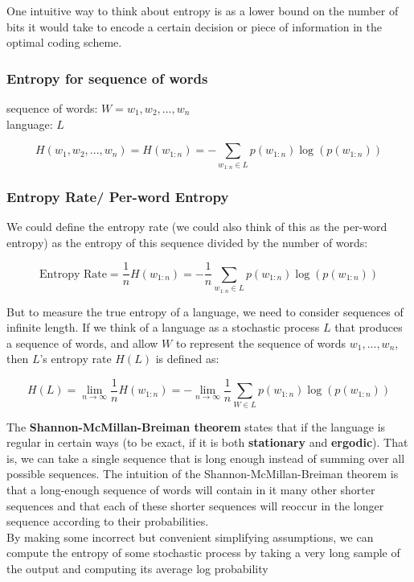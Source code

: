 One intuitive way to think about entropy is as a lower bound on the number of bits it would take to encode a certain decision or piece of information in the optimal coding scheme.

\subsubsection{Entropy for sequence of words}\label{Entropy for sequence of words}
sequence of words: $W = {w_1,w_2,...,w_n}$\\
language: $L$

\[
    H(w_1,w_2,...,w_n) = H(w_{1:n}) = -\displaystyle\sum_{w_{1:n}\in L} p(w_{1:n})\log(p(w_{1:n}))
\]

\subsubsection{Entropy Rate/ Per-word Entropy}
We could define the entropy rate (we could also think of this as the per-word entropy) as the entropy of this sequence divided by the number of words:

\[
    \text{Entropy Rate} = \displaystyle\dfrac{1}{n}H(w_{1:n}) = -\displaystyle\dfrac{1}{n}\sum_{w_{1:n}\in L} p(w_{1:n})\log(p(w_{1:n}))
\]

But to measure the true entropy of a language, we need to consider sequences of infinite length. If we think of a language as a stochastic process $L$ that produces a sequence of words, and allow $W$ to represent the sequence of words $w_1,...,w_n$, then $L$’s entropy rate $H(L)$ is defined as:

\[
    H(L) = \lim_{n \rightarrow \infty} \displaystyle\dfrac{1}{n}H(w_{1:n}) = -\lim_{n \rightarrow \infty} \displaystyle\dfrac{1}{n}\sum_{W \in L} p(w_{1:n})\log(p(w_{1:n}))
\]

The \textbf{Shannon-McMillan-Breiman theorem} states that if the language is regular in certain ways (to be exact, if it is both \textbf{stationary} and \textbf{ergodic}). That is, we can take a single sequence that is long enough instead of summing over all possible sequences. The intuition of the Shannon-McMillan-Breiman theorem is that a long-enough sequence of words will contain in it many other shorter sequences and that each of these shorter sequences will reoccur in the longer sequence according to their probabilities.\\By making some incorrect but convenient simplifying assumptions, we can compute the entropy of some stochastic process by taking a very long sample of the output and computing its average log probability


